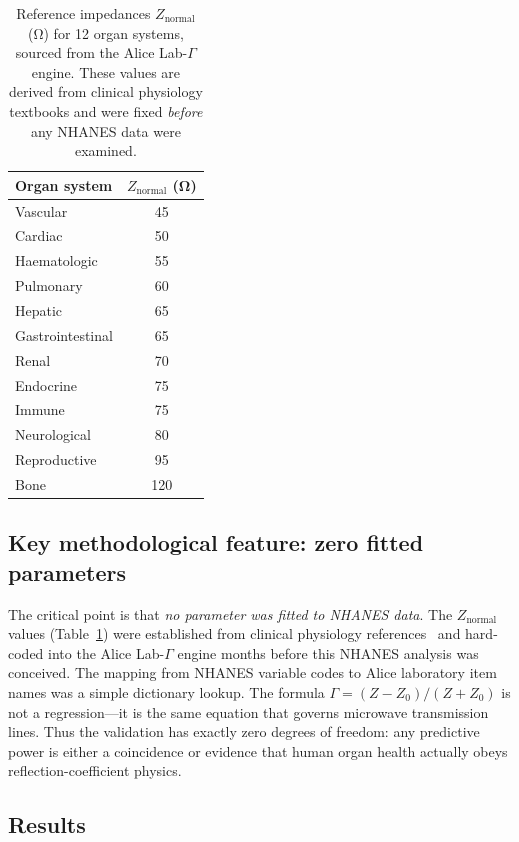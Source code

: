 \documentclass[aps,pre,twocolumn,superscriptaddress,floatfix]{revtex4-2}
\begin{document}
\begin{table}[t]
\centering
\caption{Reference impedances $Z_{\text{normal}}$ (\si{\ohm})
for 12 organ systems, sourced from the Alice Lab-$\Gamma$
engine.  These values are derived from clinical physiology
textbooks and were fixed \emph{before} any NHANES data
were examined.}
\label{tab:z-normal}
\begin{tabular}{lc}
\toprule
Organ system & $Z_{\text{normal}}$ (\si{\ohm}) \\
\midrule
Vascular    &  45 \\
Cardiac     &  50 \\
Haematologic &  55 \\
Pulmonary   &  60 \\
Hepatic     &  65 \\
Gastrointestinal & 65 \\
Renal       &  70 \\
Endocrine   &  75 \\
Immune      &  75 \\
Neurological &  80 \\
Reproductive &  95 \\
Bone        & 120 \\
\bottomrule
\end{tabular}
\end{table}

\subsection{Key methodological feature: zero fitted parameters}

The critical point is that \emph{no parameter was fitted to
NHANES data}.  The $Z_{\text{normal}}$ values
(Table~\ref{tab:z-normal}) were established from clinical
physiology references~\cite{Guyton2020,Harrison2022}
and hard-coded into the Alice Lab-$\Gamma$ engine months
before this NHANES analysis was conceived.
The mapping from NHANES variable codes to Alice laboratory
item names was a simple dictionary lookup.
The formula $\Gamma=(Z-Z_0)/(Z+Z_0)$ is not a regression---it
is the same equation that governs microwave transmission lines.
Thus the validation has exactly zero degrees of freedom:
any predictive power is either a coincidence or evidence that
human organ health actually obeys reflection-coefficient physics.

\subsection{Results}
\end{document}
